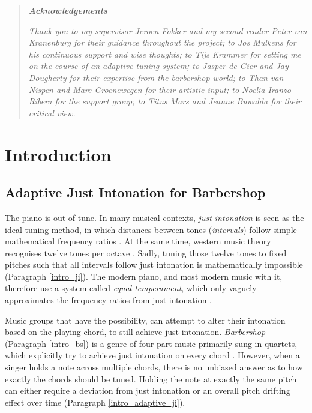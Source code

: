 \documentclass[a4paper]{article}
\begin{document}
\begin{titlepage}
\begin{quotation}
	\begin{center}
		\textbf{\textit{Acknowledgements}}
	\end{center}
	{\small \it Thank you to my supervisor Jeroen Fokker and my second reader Peter van Kranenburg for their guidance throughout the project; to Jos Mulkens for his continuous support and wise thoughts; to Tijs Krammer for setting me on the course of an adaptive tuning system; to Jasper de Gier and Jay Dougherty for their expertise from the barbershop world; to Than van Nispen and Marc Groenewegen for their artistic input; to Noelia Iranzo Ribera for the support group; to Titus Mars and Jeanne Buwalda for their critical view.}
\end{quotation}

\end{titlepage}

\newgeometry{} %
\thispagestyle{empty}

\tableofcontents

\newpage
\setcounter{page}{1}

\section{Introduction}
\subsection{Adaptive Just Intonation for Barbershop}
The piano is out of tune. In many musical contexts, \textit{just intonation} is seen as the ideal tuning method, in which distances between tones (\textit{intervals}) follow simple mathematical frequency ratios \cite{boyden_prelleur_1951, fonville_ben_1991}. At the same time, western music theory recognises twelve tones per octave \cite{persichetti_twentieth-century_1961}. Sadly, tuning those twelve tones to fixed pitches such that all intervals follow just intonation is mathematically impossible (Paragraph \ref{intro_ji}). The modern piano, and most modern music with it, therefore use a system called \textit{equal temperament}, which only vaguely approximates the frequency ratios from just intonation \cite{hinrichsen_revising_2016}.

Music groups that have the possibility, can attempt to alter their intonation based on the playing chord, to still achieve just intonation. \textit{Barbershop} (Paragraph \ref{intro_bs}) is a genre of four-part music primarily sung in quartets, which explicitly try to achieve just intonation on every chord \cite{barbershop_harmony_society_contest_2022, averill_bell_1999}. However, when a singer holds a note across multiple chords, there is no unbiased answer as to how exactly the chords should be tuned. Holding the note at exactly the same pitch can either require a deviation from just intonation or an overall pitch drifting effect over time (Paragraph \ref{intro_adaptive_ji}).
\end{document}
